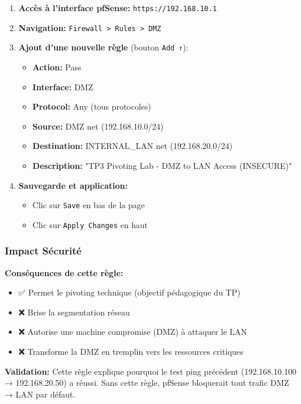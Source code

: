 \documentclass[12pt,a4paper,openany]{report}
\begin{document}
	\begin{enumerate}
		\item \textbf{Accès à l'interface pfSense:} \texttt{https://192.168.10.1}
		
		\item \textbf{Navigation:} \texttt{Firewall > Rules > DMZ}
		
		\item \textbf{Ajout d'une nouvelle règle} (bouton \texttt{Add ↑}):
		\begin{itemize}
			\item \textbf{Action:} Pass
			\item \textbf{Interface:} DMZ
			\item \textbf{Protocol:} Any (tous protocoles)
			\item \textbf{Source:} DMZ net (192.168.10.0/24)
			\item \textbf{Destination:} INTERNAL\_LAN net (192.168.20.0/24)
			\item \textbf{Description:} "TP3 Pivoting Lab - DMZ to LAN Access (INSECURE)"
		\end{itemize}
		
		\item \textbf{Sauvegarde et application:}
		\begin{itemize}
			\item Clic sur \texttt{Save} en bas de la page
			\item Clic sur \texttt{Apply Changes} en haut
		\end{itemize}
	\end{enumerate}
	
	\subsubsection{Impact Sécurité}
	
	\textbf{Conséquences de cette règle:}
	\begin{itemize}
		\item ✅ Permet le pivoting technique (objectif pédagogique du TP)
		\item ❌ Brise la segmentation réseau
		\item ❌ Autorise une machine compromise (DMZ) à attaquer le LAN
		\item ❌ Transforme la DMZ en tremplin vers les ressources critiques
	\end{itemize}
	
	\textbf{Validation:} Cette règle explique pourquoi le test ping précédent 
	(192.168.10.100 → 192.168.20.50) a réussi. Sans cette règle, pfSense 
	bloquerait tout trafic DMZ → LAN par défaut.
	
\end{document}
